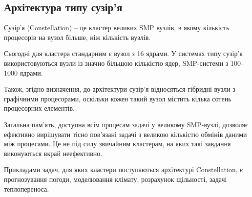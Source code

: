 \subsection{Архітектура типу сузір'я}

Сузір'я (Constellation) -- це кластер великих SMP вузлів, в якому кількість процесорів на вузол більше, ніж кількість вузлів.

Сьогодні для кластера стандарним є вузол з 16 ядрами. У системах типу сузір'я використовуються вузли із значно більшою кількістю ядер, SMP-системи з 100--1000 ядрами. 

Також, згідно визначення, до архітектури сузір'я відносяться гібридні вузли з графічними процесорами, оскільки кожен такий вузол містить кілька сотень процесорних елементів.

Загальна пам'ять, доступна всім процесам задачі у великому SMP-вузлі, дозволяє ефективно вирішувати тісно пов'язані задачі з великою кількістю обмінів даними між процесами. Це не під силу звичайним кластерам, на яких такі завдання виконуються вкрай неефективно.

Прикладами задач, для яких кластери поступаються архітектурі Constellation, є прогнозування погоди, моделювання клімату, розрахунок щільності, задачі теплопереноса.